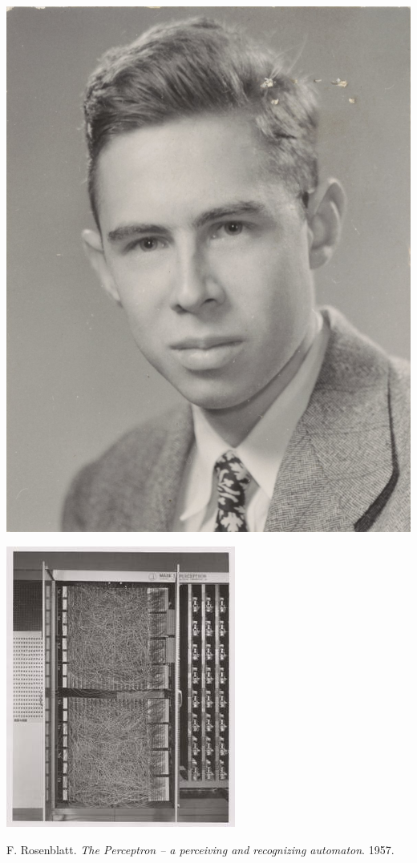 \documentclass[aspectratio=169, usenames, dvipsnames]{beamer}
\begin{document}
\begin{frame}
  \vfill
  \centering
  \begin{minipage}{.48\textwidth}
    \centering
    \includegraphics[height=.6\textheight]{Rosenblatt_21}
  \end{minipage}%
  \hfill
  \begin{minipage}{.48\textwidth}
    \includegraphics[height=.6\textheight]{Mark_I_perceptron}
  \end{minipage}

  \bigskip

  {\tiny
    F. Rosenblatt. \emph{The Perceptron -- a perceiving and recognizing automaton}. 1957.
  }

  \vfill
\end{frame}
\end{document}
